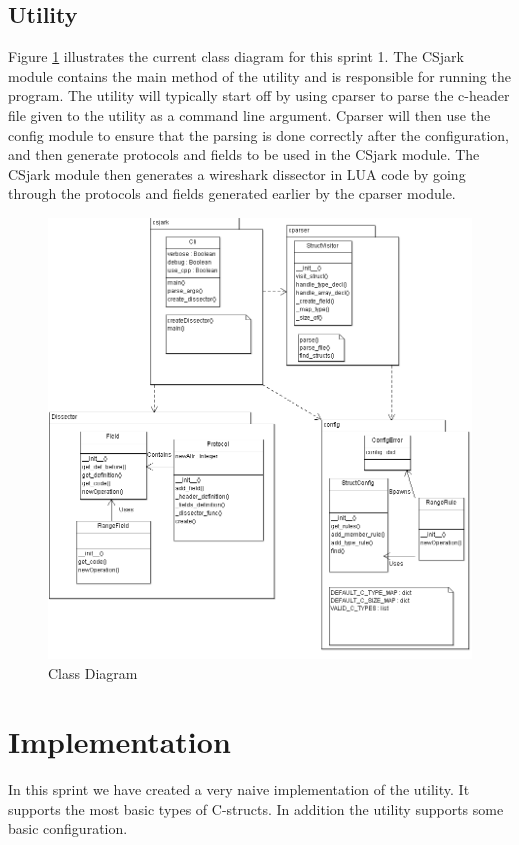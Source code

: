 \subsection{Utility}
Figure \ref{fig:sp1_class} illustrates the current class diagram for this sprint 1. The CSjark module contains the main method of the utility and is responsible for running the program. The utility will typically start off by using cparser to parse the c-header file given to the utility as a command line argument. Cparser will then use the config module to ensure that the parsing is done correctly after the configuration, and then generate protocols and fields to be used in the CSjark module. The CSjark module then generates a wireshark dissector in LUA code by going through the protocols and fields generated earlier by the cparser module. 

\begin{figure}[!ht]
\includegraphics[width=\textwidth]{./sprints/img/class_diagram_s1.png}
\caption{Class Diagram}
\label{fig:sp1_class}
\end{figure}

\section{Implementation}
In this sprint we have created a very naive implementation of the utility. It supports the most basic types of C-structs. In addition the utility supports some basic configuration.

